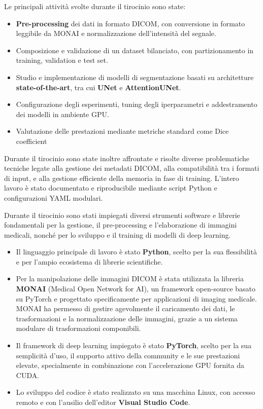 Le principali attività svolte durante il tirocinio sono state:
\begin{itemize}
    \item \textbf{Pre-processing} dei dati in formato DICOM, con conversione in formato leggibile da MONAI e normalizzazione dell’intensità del segnale.
    \item Composizione e validazione di un dataset bilanciato, con partizionamento in training, validation e test set.
    \item Studio e implementazione di modelli di segmentazione basati su architetture \textbf{state-of-the-art}, tra cui \textbf{UNet} e \textbf{AttentionUNet}.
    \item Configurazione degli esperimenti, tuning degli iperparametri e addestramento dei modelli in ambiente GPU.
    \item Valutazione delle prestazioni mediante metriche standard come Dice coefficient
\end{itemize}

Durante il tirocinio sono state inoltre affrontate e risolte diverse problematiche tecniche legate alla gestione dei metadati DICOM, alla compatibilità tra i formati di input, e alla gestione efficiente della memoria in fase di training. L'intero lavoro è stato documentato e riproducibile mediante script Python e configurazioni YAML modulari.


	
Durante il tirocinio sono stati impiegati diversi strumenti software e librerie  fondamentali per la gestione, il pre-processing e l'elaborazione di immagini medicali, nonché per lo sviluppo e il training di modelli di deep learning.
\begin{itemize}
	\item  Il linguaggio principale di lavoro è stato \textbf{Python}, scelto per la sua flessibilità e per l'ampio ecosistema di librerie scientifiche.
	\item Per la manipolazione delle immagini DICOM è stata utilizzata la libreria \textbf{MONAI} (Medical Open Network for AI), un framework open-source basato su PyTorch e progettato specificamente per applicazioni di imaging medicale. MONAI ha permesso di gestire agevolmente il caricamento dei dati, le trasformazioni e la normalizzazione delle immagini, grazie a un sistema modulare di trasformazioni componibili.
	\item Il framework di deep learning impiegato è stato \textbf{PyTorch}, scelto per la sua semplicità d'uso, il supporto attivo della community e le sue prestazioni elevate, specialmente in combinazione con l'accelerazione GPU fornita da CUDA.
	\item Lo sviluppo del codice è stato realizzato su una macchina Linux, con accesso remoto e con l'ausilio dell'editor \textbf{Visual Studio Code}.
\end{itemize}



